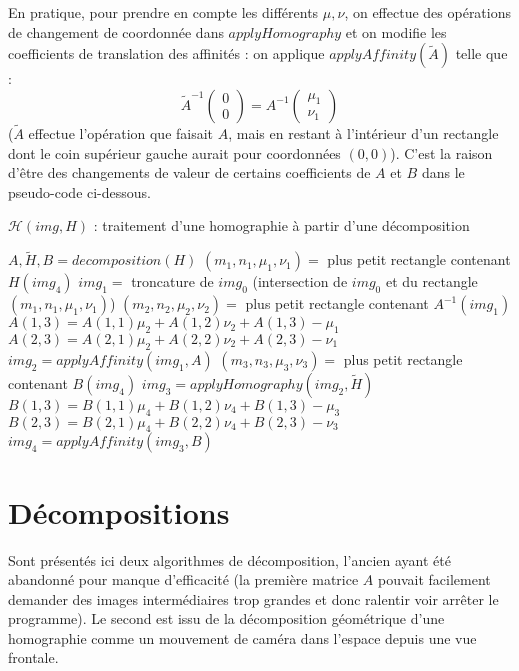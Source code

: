 \documentclass[a4paper,11pt]{article}
\newcommand{\pmatrice}[1]{\begin{pmatrix} #1 \end{pmatrix}}
\newenvironment{algorithme}{\begin{algorithm}[H]}{\end{algorithm}}
\begin{document}
    En pratique, pour prendre en compte les différents $\mu,\nu$, on effectue des opérations de changement de coordonnée dans $applyHomography$ et on modifie les coefficients de translation des affinités : on applique $applyAffinity(\tilde A)$ telle que :
    \[\tilde A^{-1}\pmatrice{0\\0}=A^{-1}\pmatrice{\mu_1\\ \nu_1}\]
    ($\tilde A$ effectue l'opération que faisait $A$, mais en restant à l'intérieur d'un rectangle dont le coin supérieur gauche aurait pour coordonnées $(0,0)$). C'est la raison d'être des changements de valeur de certains coefficients de $A$ et $B$ dans le pseudo-code ci-dessous.
    
    \begin{algorithme}
     \caption{$\mathcal H(img,H)$ : traitement d'une homographie à partir d'une décomposition}
     {
     $A,\tilde H,B = decomposition(H)$\;
     $(m_1,n_1,\mu_1,\nu_1) =$ plus petit rectangle contenant $H(img_4)$\;
     $img_1 =$ troncature de $img_0$ (intersection de $img_0$ et du rectangle $(m_1,n_1,\mu_1,\nu_1)$)\;
     $(m_2,n_2,\mu_2,\nu_2) =$ plus petit rectangle contenant $A^{-1}(img_1)$\;
     $A(1,3) = A(1,1)\mu_2+A(1,2)\nu_2+A(1,3) - \mu_1$\;
     $A(2,3) = A(2,1)\mu_2+A(2,2)\nu_2+A(2,3) - \nu_1$\;
     $img_2 = applyAffinity(img_1,A)$\;
     $(m_3,n_3,\mu_3,\nu_3) =$ plus petit rectangle contenant $B(img_4)$\;
     $img_3 = applyHomography(img_2,\tilde H)$\;
     $B(1,3) = B(1,1)\mu_4+B(1,2)\nu_4+B(1,3) - \mu_3$\;
     $B(2,3) = B(2,1)\mu_4+B(2,2)\nu_4+B(2,3) - \nu_3$\;
     $img_4 = applyAffinity(img_3,B)$\;
     }
    \end{algorithme}










 \section*{Décompositions}
  Sont présentés ici deux algorithmes de décomposition, l'ancien ayant été abandonné pour manque d'efficacité (la première matrice $A$ pouvait facilement demander des images intermédiaires trop grandes et donc ralentir voir arrêter le programme). Le second est issu de la décomposition géométrique d'une homographie comme un mouvement de caméra dans l'espace depuis une vue frontale.
  
\end{document}
